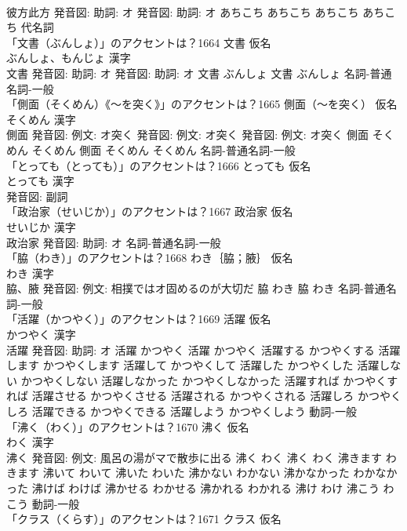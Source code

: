 \documentclass[8pt]{extreport}
\begin{document}
\begin{CJK}{UTF8}{min}
\\	彼方此方 発音図: 助詞: オ 発音図: 助詞: オ	あちこち あちこち		あちこち あちこち				代名詞 
\\	「文書（ぶんしょ）」のアクセントは？1664	文書 仮名　
\\	ぶんしょ、もんじょ 漢字　
\\	文書 発音図: 助詞: オ 発音図: 助詞: オ	文書 ぶんしょ		文書 ぶんしょ				名詞-普通名詞-一般 
\\	「側面（そくめん）《〜を突く》」のアクセントは？1665	側面（〜を突く） 仮名　
\\	そくめん 漢字　
\\	側面 発音図: 例文: オ突く 発音図: 例文: オ突く 発音図: 例文: オ突く	側面 そくめん そくめん		側面 そくめん そくめん				名詞-普通名詞-一般 
\\	「とっても（とっても）」のアクセントは？1666	とっても 仮名　
\\	とっても 漢字　
\\	発音図:							副詞 
\\	「政治家（せいじか）」のアクセントは？1667	政治家 仮名　
\\	せいじか 漢字　
\\	政治家 発音図: 助詞: オ							名詞-普通名詞-一般 
\\	「脇（わき）」のアクセントは？1668	わき｛脇；腋｝ 仮名　
\\	わき 漢字　
\\	脇、腋 発音図: 例文: 相撲ではオ固めるのが大切だ	脇 わき		脇 わき				名詞-普通名詞-一般 
\\	「活躍（かつやく）」のアクセントは？1669	活躍 仮名　
\\	かつやく 漢字　
\\	活躍 発音図: 助詞: オ	活躍 かつやく		活躍 かつやく 活躍する かつやくする 活躍します かつやくします 活躍して かつやくして 活躍した かつやくした 活躍しない かつやくしない 活躍しなかった かつやくしなかった 活躍すれば かつやくすれば 活躍させる かつやくさせる 活躍される かつやくされる 活躍しろ かつやくしろ 活躍できる かつやくできる 活躍しよう かつやくしよう				動詞-一般 
\\	「沸く（わく）」のアクセントは？1670	沸く 仮名　
\\	わく 漢字　
\\	沸く 発音図: 例文: 風呂の湯がマで散歩に出る	沸く わく		沸く わく 沸きます わきます 沸いて わいて 沸いた わいた 沸かない わかない 沸かなかった わかなかった 沸けば わけば 沸かせる わかせる 沸かれる わかれる 沸け わけ 沸こう わこう				動詞-一般 
\\	「クラス（くらす）」のアクセントは？1671	クラス 仮名　

\end{CJK}
\end{document}
